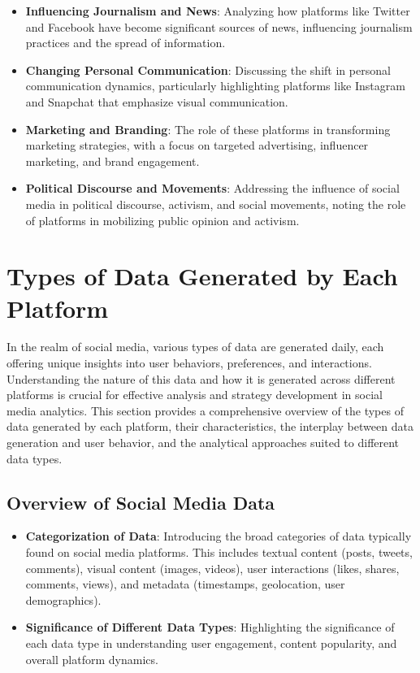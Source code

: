 \documentclass[
]{book}
\providecommand{\tightlist}{%
  \setlength{\itemsep}{0pt}\setlength{\parskip}{0pt}}
\begin{document}
\begin{itemize}
\tightlist
\item
  \textbf{Influencing Journalism and News}: Analyzing how platforms like Twitter and Facebook have become significant sources of news, influencing journalism practices and the spread of information.
\item
  \textbf{Changing Personal Communication}: Discussing the shift in personal communication dynamics, particularly highlighting platforms like Instagram and Snapchat that emphasize visual communication.
\item
  \textbf{Marketing and Branding}: The role of these platforms in transforming marketing strategies, with a focus on targeted advertising, influencer marketing, and brand engagement.
\item
  \textbf{Political Discourse and Movements}: Addressing the influence of social media in political discourse, activism, and social movements, noting the role of platforms in mobilizing public opinion and activism.
\end{itemize}

\hypertarget{types-of-data-generated-by-each-platform}{%
\section*{Types of Data Generated by Each Platform}\label{types-of-data-generated-by-each-platform}}

In the realm of social media, various types of data are generated daily, each offering unique insights into user behaviors, preferences, and interactions. Understanding the nature of this data and how it is generated across different platforms is crucial for effective analysis and strategy development in social media analytics. This section provides a comprehensive overview of the types of data generated by each platform, their characteristics, the interplay between data generation and user behavior, and the analytical approaches suited to different data types.

\hypertarget{overview-of-social-media-data}{%
\subsection*{Overview of Social Media Data}\label{overview-of-social-media-data}}

\begin{itemize}
\tightlist
\item
  \textbf{Categorization of Data}: Introducing the broad categories of data typically found on social media platforms. This includes textual content (posts, tweets, comments), visual content (images, videos), user interactions (likes, shares, comments, views), and metadata (timestamps, geolocation, user demographics).
\item
  \textbf{Significance of Different Data Types}: Highlighting the significance of each data type in understanding user engagement, content popularity, and overall platform dynamics.
\end{itemize}
\end{document}
